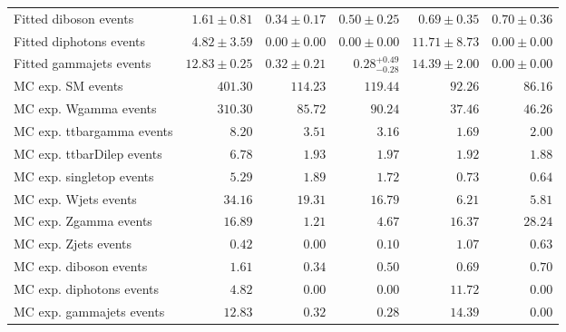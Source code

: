 \begin{table}
\begin{center}
{\begin{tabular*}{\textwidth}{@{\extracolsep{\fill}}lrrrrr}
        Fitted diboson events         & $1.61 \pm 0.81$          & $0.34 \pm 0.17$          & $0.50 \pm 0.25$          & $0.69 \pm 0.35$          & $0.70 \pm 0.36$              \\
        Fitted diphotons events         & $4.82 \pm 3.59$          & $0.00 \pm 0.00$          & $0.00 \pm 0.00$          & $11.71 \pm 8.73$          & $0.00 \pm 0.00$              \\
        Fitted gammajets events         & $12.83 \pm 0.25$          & $0.32 \pm 0.21$          & $0.28_{-0.28}^{+0.49}$          & $14.39 \pm 2.00$          & $0.00 \pm 0.00$              \\
 \noalign{\smallskip}\hline\noalign{\smallskip}
MC exp. SM events              & $401.30$          & $114.23$          & $119.44$          & $92.26$          & $86.16$              \\
\noalign{\smallskip}\hline\noalign{\smallskip}
        MC exp. Wgamma events         & $310.30$          & $85.72$          & $90.24$          & $37.46$          & $46.26$              \\
        MC exp. ttbargamma events         & $8.20$          & $3.51$          & $3.16$          & $1.69$          & $2.00$              \\
        MC exp. ttbarDilep events         & $6.78$          & $1.93$          & $1.97$          & $1.92$          & $1.88$              \\
        MC exp. singletop events         & $5.29$          & $1.89$          & $1.72$          & $0.73$          & $0.64$              \\
        MC exp. Wjets events         & $34.16$          & $19.31$          & $16.79$          & $6.21$          & $5.81$              \\
        MC exp. Zgamma events         & $16.89$          & $1.21$          & $4.67$          & $16.37$          & $28.24$              \\
        MC exp. Zjets events         & $0.42$          & $0.00$          & $0.10$          & $1.07$          & $0.63$              \\
        MC exp. diboson events         & $1.61$          & $0.34$          & $0.50$          & $0.69$          & $0.70$              \\
        MC exp. diphotons events         & $4.82$          & $0.00$          & $0.00$          & $11.72$          & $0.00$              \\
        MC exp. gammajets events         & $12.83$          & $0.32$          & $0.28$          & $14.39$          & $0.00$              \\

\end{tabular*}}
\end{center}
\end{table}
